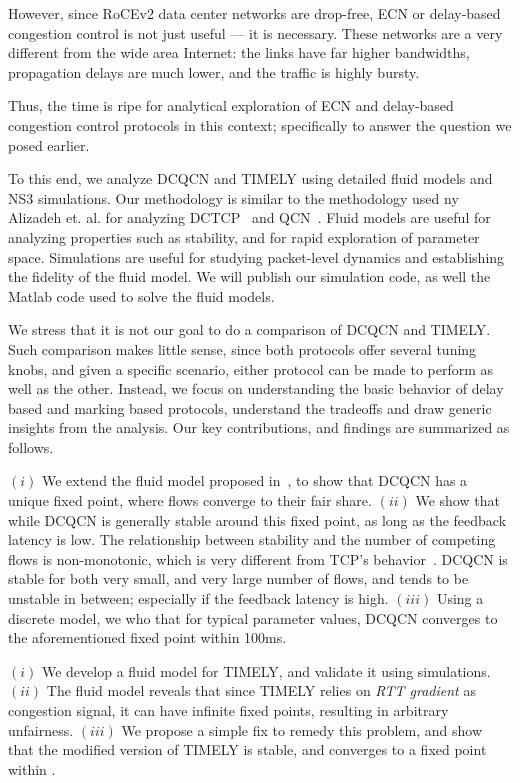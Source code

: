 However, since RoCEv2 data center networks are drop-free, ECN or
delay-based congestion control is not just useful --- it is necessary. These
networks are a very different from the wide area Internet: the links have far
higher bandwidths, propagation delays are much lower, and the traffic is highly
bursty.  

Thus, the time is ripe for analytical exploration of ECN and delay-based
congestion control protocols in this context; specifically to answer the
question we posed earlier.


To this end, we analyze DCQCN and TIMELY using detailed fluid models and NS3
simulations. Our methodology is similar to the methodology used ny Alizadeh et.
al. for analyzing DCTCP~\cite{dctcp-analysis} and QCN~\cite{qcn-analysis}. Fluid
models are useful for analyzing properties such as stability, and for rapid
exploration of parameter space.  Simulations are useful for studying
packet-level dynamics and establishing the fidelity of the fluid model.  We will
publish our simulation code, as well the Matlab code used to solve the fluid
models.


We stress that it is not our goal to do a comparison of DCQCN and
TIMELY.  Such comparison makes little sense, since both protocols offer several
tuning knobs, and given a specific scenario, either protocol can be made to
perform as well as the other. Instead, we focus on understanding the basic
behavior of delay based and marking based protocols, understand the
tradeoffs and draw generic insights from the analysis.
Our key contributions, and findings are summarized as follows.

 $(i)$ We extend the fluid model proposed in~\cite{dcqcn}, to
show that DCQCN has a unique fixed point, where flows converge to their fair
share. $(ii)$ We show that while DCQCN is generally stable around this
fixed point, as long as the feedback latency is low. The relationship between
stability and the number of competing flows is non-monotonic, which is very
different from TCP's behavior~\cite{misra:TAC2002}. DCQCN is stable for both
very small, and very large number of flows, and tends to be unstable in between;
especially if the feedback latency is high.  $(iii)$ Using a discrete model, we
who that for typical parameter values, DCQCN converges to the aforementioned
fixed point within 100ms.

 $(i)$ We develop a fluid model for TIMELY, and validate it using
simulations. $(ii)$ The fluid model reveals that since TIMELY relies on {\em RTT
gradient} as congestion signal, it can have infinite fixed points, resulting in
arbitrary unfairness.  $(iii)$ We propose a simple fix to remedy this problem,
and show that the modified version of TIMELY is stable, and converges to a fixed
point within . 

